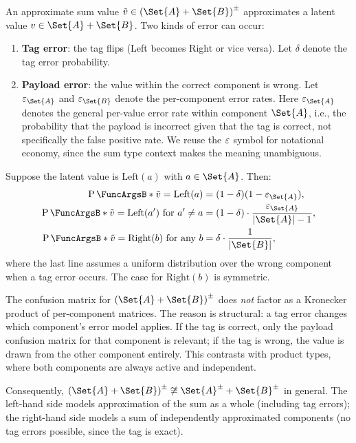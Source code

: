 \documentclass[ ../main.tex]{subfiles}
\begin{document}
\begin{definition}
An approximate sum value $\tilde{v} \in \AT{(\Set{A} + \Set{B})}$ approximates a latent value $v \in \Set{A} + \Set{B}$.
Two kinds of error can occur:
\begin{enumerate}
\item \textbf{Tag error}: the tag flips (Left becomes Right or vice versa). Let $\delta$ denote the tag error probability.
\item \textbf{Payload error}: the value within the correct component is wrong. Let $\fprate_{\Set{A}}$ and $\fprate_{\Set{B}}$ denote the per-component error rates.
Here $\fprate_{\Set{A}}$ denotes the general per-value error rate within component $\Set{A}$, i.e., the probability that the payload is incorrect given that the tag is correct, not specifically the false positive rate.
We reuse the $\varepsilon$ symbol for notational economy, since the sum type context makes the meaning unambiguous.
\end{enumerate}
\end{definition}

\begin{theorem}
\label{thm:sum_error}
Suppose the latent value is $\mathrm{Left}(a)$ with $a \in \Set{A}$.
Then:
\begin{align}
\Prob{\tilde{v} = \mathrm{Left}(a)} &= (1 - \delta)(1 - \fprate_{\Set{A}}), \\
\Prob{\tilde{v} = \mathrm{Left}(a') \text{ for } a' \neq a} &= (1 - \delta) \cdot \frac{\fprate_{\Set{A}}}{|\Set{A}| - 1}, \\
\Prob{\tilde{v} = \mathrm{Right}(b) \text{ for any } b} &= \delta \cdot \frac{1}{|\Set{B}|},
\end{align}
where the last line assumes a uniform distribution over the wrong component when a tag error occurs.
The case for $\mathrm{Right}(b)$ is symmetric.
\end{theorem}

\begin{remark}
\label{rem:sum_nonfactor}
The confusion matrix for $\AT{(\Set{A} + \Set{B})}$ does \emph{not} factor as a Kronecker product of per-component matrices.
The reason is structural: a tag error changes which component's error model applies.
If the tag is correct, only the payload confusion matrix for that component is relevant; if the tag is wrong, the value is drawn from the other component entirely.
This contrasts with product types, where both components are always active and independent.

Consequently, $\AT{(\Set{A} + \Set{B})} \not\cong \AT{\Set{A}} + \AT{\Set{B}}$ in general.
The left-hand side models approximation of the sum as a whole (including tag errors); the right-hand side models a sum of independently approximated components (no tag errors possible, since the tag is exact).
\end{remark}
\end{document}
